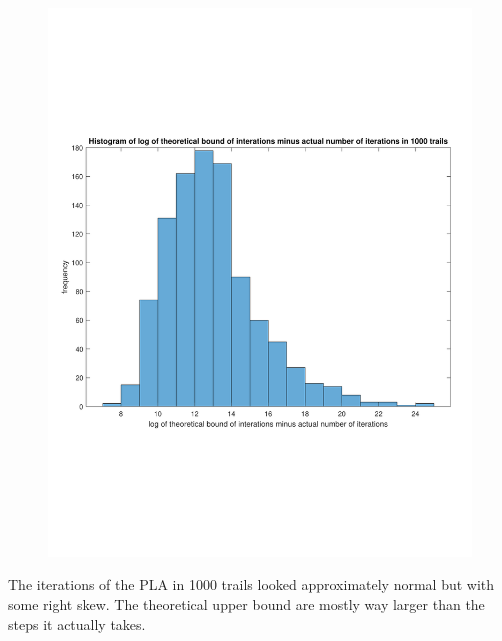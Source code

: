 \documentclass[12pt]{article}
\begin{document}
\begin{enumerate}
  \begin{figure}[H]
    \centering
    \includegraphics[width=7in]{prob2-2.pdf}
  \end{figure}

 The iterations of the PLA in 1000 trails looked approximately normal but with some right skew. The theoretical upper bound are mostly way larger than the steps it actually takes. 


\end{enumerate}
\end{document}
